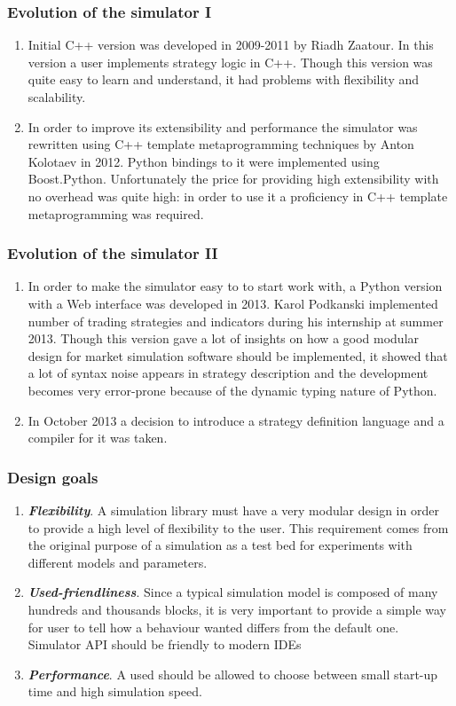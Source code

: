 \documentclass{beamer}
\begin{document}
\begin{frame}
\frametitle{Evolution of the simulator I}
\begin{enumerate}
  \item Initial C++ version was developed in 2009-2011 by Riadh Zaatour. In this version a user implements strategy logic in C++. Though this version was quite easy to learn and understand, it had problems with flexibility and scalability.
  \item In order to improve its extensibility and performance the simulator was rewritten using C++ template metaprogramming techniques by Anton Kolotaev in 2012. Python bindings to it were implemented using Boost.Python. Unfortunately the price for providing high extensibility with no overhead was quite high: in order to use it a proficiency in C++ template metaprogramming was required.
\end{enumerate}
\end{frame}
\begin{frame}
\frametitle{Evolution of the simulator II}
\begin{enumerate}
  \item In order to make the simulator easy to to start work with, a Python version with a Web interface was developed in 2013. Karol Podkanski implemented number of trading strategies and indicators during his internship at summer 2013. Though this version gave a lot of insights on how a good modular design for market simulation software should be implemented, it showed that a lot of syntax noise appears in strategy description and the development becomes very error-prone because of the dynamic typing nature of Python.
  \item In October 2013 a decision to introduce a strategy definition language and a compiler for it was taken.
\end{enumerate}
\end{frame}
\begin{frame}
\frametitle{Design goals}
\begin{enumerate}
  \item \textbf{\textit{Flexibility}}. A simulation library must have a very modular design in order to provide a high level of flexibility to the user. This requirement comes from the original purpose of a simulation as a test bed for experiments with different models and parameters.
  \item \textbf{\textit{Used-friendliness}}. Since a typical simulation model is composed of many hundreds and thousands blocks, it is very important to provide a simple way for user to tell how a behaviour wanted differs from the default one. Simulator API should be friendly to modern IDEs
  \item \textbf{\textit{Performance}}. A used should be allowed to choose between small start-up time and high simulation speed.
\end{enumerate}
\end{frame}
\end{document}
